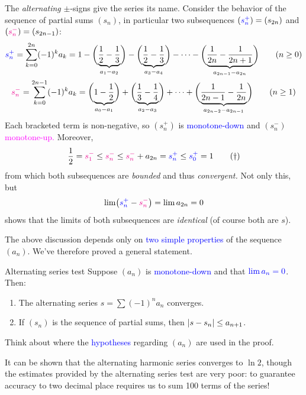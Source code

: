The \emph{alternating} $\pm$-signs give the series its name. Consider the behavior of the sequence of partial sums $(s_n)$, in particular two subsequences $(\textcolor{blue}{s_n^+})=(s_{2n})$ and $(\textcolor{magenta}{s_n^-})=(s_{2n-1})$:
\begin{gather*}
	\textcolor{blue}{s_n^+}=\sum_{k=0}^{2n}(-1)^ka_k 
		 =1 
		 -\biggl(\underbrace{\frac 12-\frac 13}_{a_1-a_2}\biggr) 
		 -\biggl(\underbrace{\frac 12-\frac 13}_{a_3-a_4}\biggr)
		 -\cdots 
		 -\biggl(\underbrace{\frac 1{2n}-\frac 1{2n+1}}_{a_{2n-1}-a_{2n}}\biggr) 
		 \tag{$n\ge 0$}\\
	\textcolor{magenta}{s_n^-}=\sum_{k=0}^{2n-1}(-1)^ka_k 
		=\biggl(\underbrace{1-\frac 12}_{a_0-a_1}\biggr) 
		+\biggl(\underbrace{\frac 13-\frac 14}_{a_2-a_3}\biggr) 
		+\cdots 
		+\biggl(\underbrace{\frac 1{2n-1}-\frac 1{2n}}_{a_{2n-2}-a_{2n-1}}\biggr) 
		\tag{$n\ge 1$}
\end{gather*}
Each bracketed term is non-negative, so $(s_n^+)$ is \textcolor{blue}{monotone-down} and $(s_n^-)$ \textcolor{magenta}{monotone-up.} Moreover,
\[
	\frac 12=\textcolor{magenta}{s_1^-}
	\le \textcolor{magenta}{s_n^-}
	\le \textcolor{magenta}{s_n^-}+a_{2n} 
	= \textcolor{blue}{s_n^+} 
	\le \textcolor{blue}{s_0^+} 
	=1 \tag{$\dag$}
\]
from which both subsequences are \emph{bounded} and thus \emph{convergent.} Not only this, but
\[
	\lim\bigl(\textcolor{blue}{s_n^+} 
	-\textcolor{magenta}{s_n^-}\bigr) 
	=\lim a_{2n} =0
\]
shows that the limits of both subsequences are \emph{identical} (of course both are $s$).

\goodbreak

The above discussion depends only on \textcolor{blue}{two simple properties} of the sequence $(a_n)$. We've therefore proved a general statement.

\begin{thm}{Alternating series test}{}
	Suppose $(a_n)$ is \textcolor{blue}{monotone-down} and that $\textcolor{blue}{\lim a_n=0}$. Then:
	\begin{enumerate}
	  \item The alternating series $s=\sum (-1)^na_n$ converges.
		\item If $(s_n)$ is the sequence of partial sums, then $\left| s-s_n\right|\le a_{n+1}$.
	\end{enumerate} 
\end{thm}

Think about where the \textcolor{blue}{hypotheses} regarding $(a_n)$ are used in the proof.\smallbreak

It can be shown that the alternating harmonic series converges to $\ln 2$, though the estimates provided by the alternating series test are very poor: to guarantee accuracy to two decimal place requires us to sum 100 terms of the series!

